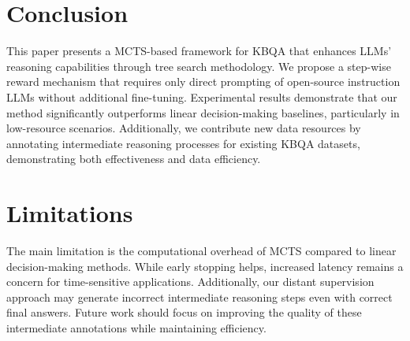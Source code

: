 \section{Conclusion}
This paper presents a MCTS-based framework for KBQA that enhances LLMs' reasoning capabilities through tree search methodology.
We propose a step-wise reward mechanism that requires only direct prompting of open-source instruction LLMs without additional fine-tuning.
Experimental results demonstrate that our method significantly outperforms linear decision-making baselines, particularly in low-resource scenarios.
Additionally, we contribute new data resources by annotating intermediate reasoning processes for existing KBQA datasets, demonstrating both effectiveness and data efficiency.

\section*{Limitations}
The main limitation is the computational overhead of MCTS compared to linear decision-making methods. While early stopping helps, increased latency remains a concern for time-sensitive applications. Additionally, our distant supervision approach may generate incorrect intermediate reasoning steps even with correct final answers. Future work should focus on improving the quality of these intermediate annotations while maintaining efficiency.
